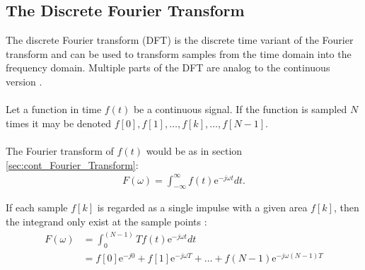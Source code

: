 \subsection{The Discrete Fourier Transform} \label{sec:DFT}
%
%
%
The discrete Fourier transform (DFT) is the discrete time variant of the Fourier transform and can be used to transform samples from the time domain into the frequency domain.
Multiple parts of the DFT are analog to the continuous version \cite{DFT_OX}.
\\ \\
Let a function in time $f(t)$ be a continuous signal.
If the function is sampled $N$ times it may be denoted
$f[0],f[1],\dots,f[k],\dots,f[N-1]$.
\\ \\
The Fourier transform of $f(t)$ would be as in section \ref{sec:cont_Fourier_Transform}:
\begin{align*}
	F(\omega) = \int_{-\infty}^\infty f(t)\text{e}^{-j\omega t} dt.
\end{align*}

If each sample $f[k]$ is regarded as a single impulse with a given area $f[k]$, then the integrand only exist at the sample points \cite{DFT_OX}:
\begin{align*}
	F(\omega) 
	&= \int_0^{(N-1)}T f(t) \text{e}^{-j\omega t}dt\\
	&= f[0]\text{e}^{-j0} + f[1]\text{e}^{-j\omega T} + \dots + 	f(N-1) \text{e}^{-j	\omega(N-1)T}	
\end{align*}

